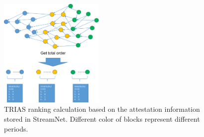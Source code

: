 \begin{figure}[!ht]
        \begin{center}
                \includegraphics[width=0.45\textwidth]{figures/ranking.pdf}
                \caption{TRIAS ranking calculation based on the attestation information stored in StreamNet. Different color of blocks represent different periods.}
                \label{ranking}
        \end{center}
\end{figure}
